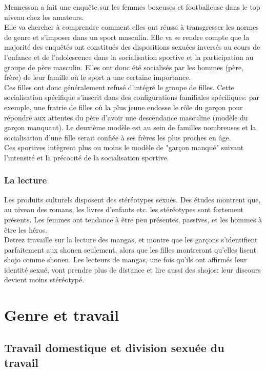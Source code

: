 \documentclass[12pt, a4paper, openany]{book}
\begin{document}
Mennesson a fait une enquête sur les femmes boxeuses et footballeuse dans le top niveau chez les amateurs. \\
Elle va chercher à comprendre comment elles ont réussi à transgresser les normes de genre et s'imposer dans un sport masculin. Elle va se rendre compte que la majorité des enquêtés ont constitués des dispositions sexuées inversés au cours de l'enfance et de l'adolescence dans la socialisation sportive et la participation au groupe de père masculin. Elles ont donc été socialisés par les hommes (père, frère) de leur famille où le sport a une certaine importance. \\
Ces filles ont donc généralement refusé d'intégré le groupe de filles. Cette socialisation spécifique s'inscrit dans des configurations familiales spécifiques: par exemple, une fratrie de filles où la plus jeune endosse le rôle du garçon pour répondre aux attentes du père d'avoir une descendance masculine (modèle du garçon manquant). Le deuxième modèle est au sein de familles nombreuses et la socialisation d'une fille serait confiée à ses frères les plus proches en âge. \\
Ces sportives intègrent plus ou moins le modèle de "garçon manqué" suivant l'intensité et la précocité de la socialisation sportive. 

\subsection{La lecture}

Les produits culturels disposent des stéréotypes sexués. Des études montrent que, au niveau des romans, les livres d'enfants etc. les stéréotypes sont fortement présents. Les femmes ont tendance à être peu présentes, passives, et les hommes à être les héros. \\
Detrez travaille sur la lecture des mangas, et montre que les garçons s'identifient parfaitement aux shonen seulement, alors que les filles montreront qu'elles lisent shojo comme shonen. Les lecteurs de mangas, une fois qu'ils ont affirmés leur identité sexué, vont prendre plus de distance et lire aussi des shojos: leur discours devient moins stéréotypé. 




\chapter{Genre et travail}

\section{Travail domestique et division sexuée du travail}
\end{document}
